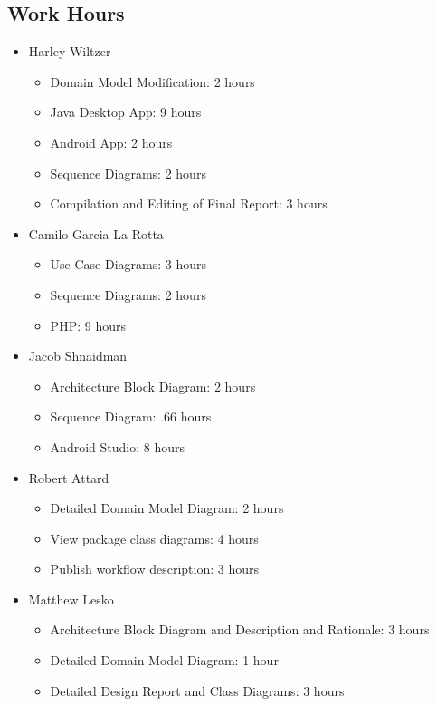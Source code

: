 \documentclass[12pt]{article}
\begin{document}
\subsection{Work Hours}

\begin{itemize}
    \item Harley Wiltzer
		\begin{itemize}
			\item Domain Model Modification: 2 hours
			\item Java Desktop App: 9 hours
			\item Android App: 2 hours
			\item Sequence Diagrams: 2 hours
			\item Compilation and Editing of Final Report: 3 hours
		\end{itemize}
    \item Camilo Garcia La Rotta
    \begin{itemize}
        \item Use Case Diagrams: 3 hours
        \item Sequence Diagrams: 2 hours
        \item PHP: 9 hours
    \end{itemize}
    \item Jacob Shnaidman
    \begin{itemize}
        \item Architecture Block Diagram: 2 hours
        \item Sequence Diagram: .66 hours
        \item Android Studio: 8 hours
    \end{itemize}
    \item Robert Attard
    \begin{itemize}
        \item Detailed Domain Model Diagram: 2 hours
    	\item View package class diagrams: 4 hours
    	\item Publish workflow description: 3 hours
    \end{itemize}
    \item Matthew Lesko
    \begin{itemize}
    	\item Architecture Block Diagram and Description and Rationale: 3 hours
    	\item Detailed Domain Model Diagram: 1 hour
    	\item Detailed Design Report and Class Diagrams: 3 hours
    \end{itemize}
\end{itemize}
\end{document}
